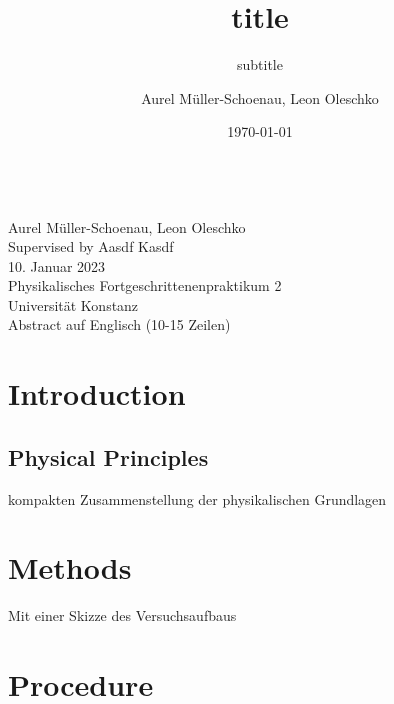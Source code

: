 \documentclass[
    parskip=half, 
    twoside=false,
    twocolumn=true
]{scrarticle}
\begin{document}
\title{title}
\subtitle{subtitle}
\author{Aurel Müller-Schoenau, Leon Oleschko}
\date{\dotdate\today}


\begin{titlepage}
    \sffamily

    \vspace*{3cm}
    {
        \fontsize{32}{32}
    }
    \vspace{.25cm}\\
    {
        \Large
        Aurel Müller-Schoenau, Leon Oleschko\\
        Supervised by Aasdf Kasdf
        \vspace{.05cm}\\
        10. Januar 2023
        \vspace{.25cm}\\
        \normalsize
        Physikalisches Fortgeschrittenenpraktikum 2\\
        Universität Konstanz
    }
    \vspace{3cm}\\
    {
        Abstract auf Englisch (10-15 Zeilen)
        \blindtext[2]
    }
\end{titlepage}


\section{Introduction}
\blindtext

\subsection{Physical Principles}
kompakten Zusammenstellung der physikalischen Grundlagen
\blindtext

\section{Methods}
Mit einer Skizze des Versuchsaufbaus
\blindtext[3]

\pagebreak
\section{Procedure}
\blindtext[5]

\pagebreak
\end{document}
